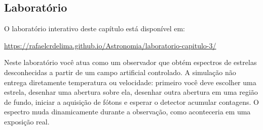 \documentclass[11pt,a4paper]{article}
\begin{document}
\subsection*{Laboratório}
O laboratório interativo deste capítulo está disponível em:

\begin{center}
\url{https://rafaelcrdelima.github.io/Astronomia/laboratorio-capitulo-3/}
\end{center}

Neste laboratório você atua como um observador que obtém espectros de estrelas desconhecidas a partir de um campo artificial controlado. A simulação não entrega diretamente temperatura ou velocidade: primeiro você deve escolher uma estrela, desenhar uma abertura sobre ela, desenhar outra abertura em uma região de fundo, iniciar a aquisição de fótons e esperar o detector acumular contagens. O espectro muda dinamicamente durante a observação, como aconteceria em uma exposição real.
\end{document}
